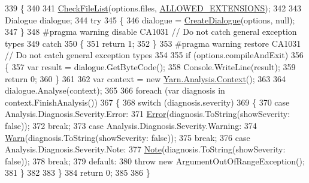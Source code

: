 \begin{DoxyCode}
339         \{
340 
341             \hyperlink{a00197_ad77564b25725a771f0fd4da430582e6f}{CheckFileList}(options.files, \hyperlink{a00197_a0979de7ea02c8c0375b8220a12e6575e}{ALLOWED\_EXTENSIONS});
342 
343             Dialogue dialogue;
344             \textcolor{keywordflow}{try}
345             \{
346                 dialogue = \hyperlink{a00197_aab244361a510cee18ad2f636d110e0d5}{CreateDialogue}(options, null);
347             \}
348 \textcolor{preprocessor}{#pragma warning disable CA1031 // Do not catch general exception types}
349 \textcolor{preprocessor}{}            \textcolor{keywordflow}{catch}
350             \{
351                 \textcolor{keywordflow}{return} 1;
352             \}
353 \textcolor{preprocessor}{#pragma warning restore CA1031 // Do not catch general exception types}
354 \textcolor{preprocessor}{}
355             \textcolor{keywordflow}{if} (options.compileAndExit)
356             \{
357                 var result = dialogue.GetByteCode();
358                 Console.WriteLine(result);
359                 \textcolor{keywordflow}{return} 0;
360             \}
361 
362             var context = \textcolor{keyword}{new} \hyperlink{a00059}{Yarn.Analysis.Context}();
363 
364             dialogue.Analyse(context);
365 
366             \textcolor{keywordflow}{foreach} (var diagnosis \textcolor{keywordflow}{in} context.FinishAnalysis())
367             \{
368                 \textcolor{keywordflow}{switch} (diagnosis.severity)
369                 \{
370                     \textcolor{keywordflow}{case} Analysis.Diagnosis.Severity.Error:
371                         \hyperlink{a00197_a2f63f9f5b7634cb50ee75ff2eb18b137}{Error}(diagnosis.ToString(showSeverity: \textcolor{keyword}{false}));
372                         \textcolor{keywordflow}{break};
373                     \textcolor{keywordflow}{case} Analysis.Diagnosis.Severity.Warning:
374                         \hyperlink{a00197_a979bb6f049b6c5294f745a19e24ddd9d}{Warn}(diagnosis.ToString(showSeverity: \textcolor{keyword}{false}));
375                         \textcolor{keywordflow}{break};
376                     \textcolor{keywordflow}{case} Analysis.Diagnosis.Severity.Note:
377                         \hyperlink{a00197_a939cc9e943c574b36c6af93e9c772702}{Note}(diagnosis.ToString(showSeverity: \textcolor{keyword}{false}));
378                         \textcolor{keywordflow}{break};
379                     \textcolor{keywordflow}{default}:
380                         \textcolor{keywordflow}{throw} \textcolor{keyword}{new} ArgumentOutOfRangeException();
381                 \}
382 
383             \}
384             \textcolor{keywordflow}{return} 0;
385 
386         \}
\end{DoxyCode}


